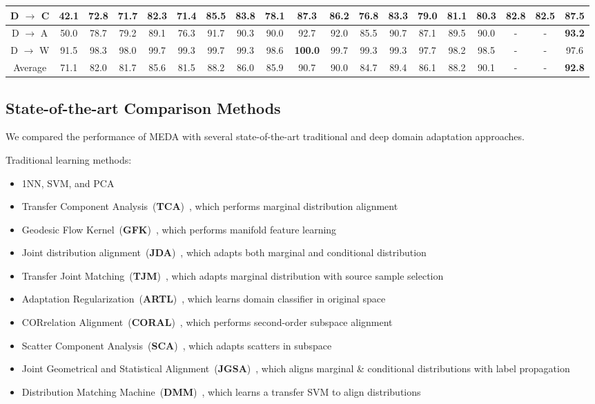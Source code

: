 \documentclass[sigconf]{acmart}
\begin{document}
\begin{table*}[ht]
{\begin{tabular}{|c|c|c|c|c|c|c|c|c|c|c|c|c|c|c|c|c|c|c|}
			D $\rightarrow$ C & 42.1 & 72.8 & 71.7 & 82.3 & 71.4 & 85.5 & 83.8 & 78.1 & 87.3 & 86.2 & 76.8 & 83.3 & 79.0 & 81.1 & 80.3 & 82.8 & 82.5 & \textbf{87.5} \\ \hline
			D $\rightarrow$ A & 50.0 & 78.7 & 79.2 & 89.1 & 76.3 & 91.7 & 90.3 & 90.0 & 92.7 & 92.0 & 85.5 & 90.7 & 87.1 & 89.5 & 90.0 & - & - & \textbf{93.2} \\ \hline
			D $\rightarrow$ W & 91.5 & 98.3 & 98.0 & 99.7 & 99.3 & 99.7 & 99.3 & 98.6 & \textbf{100.0} & 99.7 & 99.3 & 99.3 & 97.7 & 98.2 & 98.5 & - & - & 97.6 \\ \hline \hline
			Average & 71.1 & 82.0 & 81.7 & 85.6 & 81.5 & 88.2 & 86.0 & 85.9 & 90.7 & 90.0 & 84.7 & 89.4 & 86.1 & 88.2 & 90.1 & - & - & \textbf{92.8} \\ \hline	
		\end{tabular}
	}
\vspace{-.1in}
\end{table*}

\subsection{State-of-the-art Comparison Methods}
We compared the performance of MEDA with several state-of-the-art traditional and deep domain adaptation approaches.

Traditional learning methods:

\begin{itemize}[noitemsep,nolistsep]
	\item 1NN, SVM, and PCA
	\item Transfer Component Analysis~(\textbf{TCA})~\cite{pan2011domain}, which performs marginal distribution alignment
	\item Geodesic Flow Kernel~(\textbf{GFK})~\cite{gong2012geodesic}, which performs manifold feature learning
	\item Joint distribution alignment~(\textbf{JDA})~\cite{long2013transfer}, which adapts both marginal and conditional distribution
	\item Transfer Joint Matching~(\textbf{TJM})~\cite{long2014transfer}, which adapts marginal distribution with source sample selection
	\item Adaptation Regularization~(\textbf{ARTL})~\cite{long2014adaptation}, which learns domain classifier in original space
	\item CORrelation Alignment~(\textbf{CORAL})~\cite{sun2016return}, which performs second-order subspace alignment
	\item Scatter Component Analysis~(\textbf{SCA})~\cite{ghifary2017scatter}, which adapts scatters in subspace
	\item Joint Geometrical and Statistical Alignment~(\textbf{JGSA})~\cite{zhang2017joint}, which aligns marginal \& conditional distributions with label propagation
	\item Distribution Matching Machine~(\textbf{DMM})~\cite{cao2018unsupervised}, which learns a transfer SVM to align distributions
\end{itemize}
\end{document}
